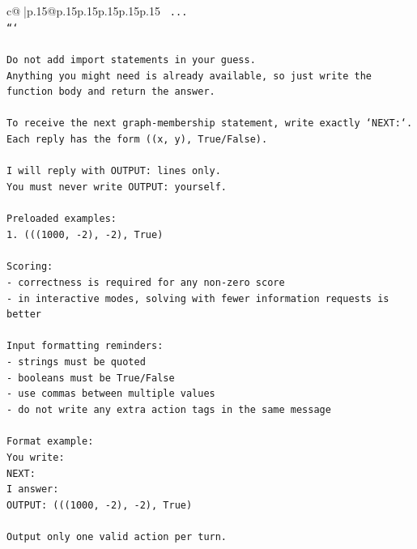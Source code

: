 \documentclass{article}
\begin{document}
{\begin{supertabular}{c@{$\;$}|p{.15\linewidth}@{}p{.15\linewidth}p{.15\linewidth}p{.15\linewidth}p{.15\linewidth}p{.15\linewidth}}
{{{\texttt{    ...} \\
\texttt{```} \\
\\ 
\texttt{Do not add import statements in your guess.} \\
\texttt{Anything you might need is already available, so just write the function body and return the answer.} \\
\\ 
\texttt{To receive the next graph{-}membership statement, write exactly `NEXT:`.} \\
\texttt{Each reply has the form ((x, y), True/False).} \\
\\ 
\texttt{I will reply with OUTPUT: lines only.} \\
\texttt{You must never write OUTPUT: yourself.} \\
\\ 
\texttt{Preloaded examples:} \\
\texttt{1. (((1000, {-}2), {-}2), True)} \\
\\ 
\texttt{Scoring:} \\
\texttt{{-} correctness is required for any non{-}zero score} \\
\texttt{{-} in interactive modes, solving with fewer information requests is better} \\
\\ 
\texttt{Input formatting reminders:} \\
\texttt{{-} strings must be quoted} \\
\texttt{{-} booleans must be True/False} \\
\texttt{{-} use commas between multiple values} \\
\texttt{{-} do not write any extra action tags in the same message} \\
\\ 
\texttt{Format example:} \\
\texttt{You write:} \\
\texttt{NEXT:} \\
\texttt{I answer:} \\
\texttt{OUTPUT: (((1000, {-}2), {-}2), True)} \\
\\ 
\texttt{Output only one valid action per turn.} \\
            }
        }
    }
     \\ \\


\end{supertabular}}
\end{document}

